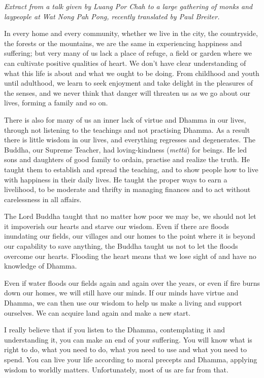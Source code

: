
\emph{Extract from a talk given by Luang Por Chah to a large gathering
of monks and laypeople at Wat Nong Pah Pong, recently translated by Paul
Breiter.}

In every home and every community, whether we live in the city, the
countryside, the forests or the mountains, we are the same in
experiencing happiness and suffering; but very many of us lack a place
of refuge, a field or garden where we can cultivate positive qualities
of heart. We don't have clear understanding of what this life is about
and what we ought to be doing. From childhood and youth until adulthood, 
we learn to seek enjoyment and take delight in the pleasures of the
senses, and we never think that danger will threaten us as we go about
our lives, forming a family and so on. 

There is also for many of us an inner lack of virtue and Dhamma in our
lives, through not listening to the teachings and not practising Dhamma. 
As a result there is little wisdom in our lives, and everything
regresses and degenerates. The Buddha, our Supreme Teacher, had
loving-kindness (\emph{mettā}) for beings. He led sons and daughters of
good family to ordain, practise and realize the truth. He taught them to
establish and spread the teaching, and to show people how to live with
happiness in their daily lives. He taught the proper ways to earn a
livelihood, to be moderate and thrifty in managing finances and to act
without carelessness in all affairs. 

The Lord Buddha taught that no matter how poor we may be, we should not
let it impoverish our hearts and starve our wisdom. Even if there are
floods inundating our fields, our villages and our homes to the point
where it is beyond our capability to save anything, the Buddha taught us
not to let the floods overcome our hearts. Flooding the heart means that
we lose sight of and have no knowledge of Dhamma. 

Even if water floods our fields again and again over the years, or even
if fire burns down our homes, we will still have our minds. If our minds
have virtue and Dhamma, we can then use our wisdom to help us make a
living and support ourselves. We can acquire land again and make a new
start. 

I really believe that if you listen to the Dhamma, contemplating it and
understanding it, you can make an end of your suffering. You will know
what is right to do, what you need to do, what you need to use and what
you need to spend. You can live your life according to moral precepts
and Dhamma, applying wisdom to worldly matters. Unfortunately, most of
us are far from that. 

